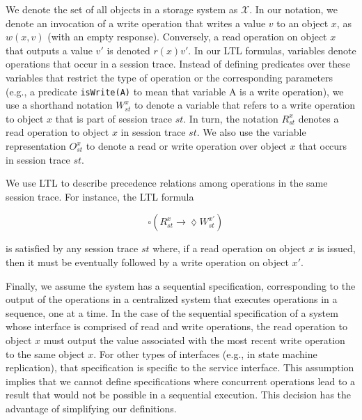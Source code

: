 \documentclass[journal,compsoc]{IEEEtran}
\begin{document}
We denote the set of all objects in a storage system as $\mathcal{X}$. In our notation, we denote an invocation of a write operation that writes a value $v$ to an object $x$, as $w(x,v)$ (with an empty response). Conversely, a read operation on object $x$ that outputs a value $v'$ is denoted $r(x){v'}$.
In our LTL formulas, variables denote operations that occur in a session trace.
Instead of defining predicates over these variables that restrict the type of operation or the corresponding parameters (e.g., a predicate {\tt isWrite(A)} to mean that variable A is a write operation), we use a shorthand notation $W^{x}_{st}$ to denote a variable that refers to a write operation to object $x$ that is part of session trace $st$. In turn, the notation $R^{x}_{st}$ denotes a read operation to object $x$ in session trace $st$. We also use the variable representation $O^{x}_{st}$ to denote a read or write operation over object $x$ that occurs in session trace $st$.

We use LTL to describe precedence relations among operations in the same session trace. For instance, the LTL formula

$$ \quad \square \left( R_\mathit{st}^x \rightarrow \lozenge W_\mathit{st}^{x'} \right) $$

\noindent is satisfied by any session trace $st$ where, if a read operation on object $x$ is issued, then it must be eventually followed by a write operation on object $x'$.

 Finally, we assume the system has a sequential specification, %
 corresponding to the output of the operations in a centralized system that executes operations in a sequence, one at a time. In the case of the sequential specification of a system whose interface is comprised of read and write operations, the read operation to object $x$ must output the value associated with the most recent write operation to the same object $x$. For other types of interfaces (e.g., in state machine replication), that specification %
 is specific to the service interface. %
This assumption implies that we cannot define specifications where concurrent operations lead to a result that would not be possible in a sequential execution. This decision has the advantage of simplifying our definitions.
\end{document}
